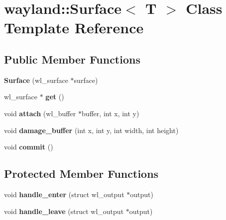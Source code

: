\hypertarget{classwayland_1_1Surface}{}\section{wayland\+::Surface$<$ T $>$ Class Template Reference}
\label{classwayland_1_1Surface}
\subsection*{Public Member Functions}
\begin{DoxyCompactItemize}
\item 
\mbox{\label{classwayland_1_1Surface_ae6c2ccc191d8db31c5ac86178d12c2cf}} 
{\bfseries Surface} (wl\+\_\+surface $\ast$surface)
\item 
\mbox{\label{classwayland_1_1Surface_a75e18c61f3514149ee980f8fbd85f6f7}} 
wl\+\_\+surface $\ast$ {\bfseries get} ()
\item 
\mbox{\label{classwayland_1_1Surface_a345de99f1061edd208220aa990e9aa4f}} 
void {\bfseries attach} (wl\+\_\+buffer $\ast$buffer, int x, int y)
\item 
\mbox{\label{classwayland_1_1Surface_ad5e7d371020467076a0d31e512d731ed}} 
void {\bfseries damage\+\_\+buffer} (int x, int y, int width, int height)
\item 
\mbox{\label{classwayland_1_1Surface_a11cba9dc143bb00d46a7a41099831068}} 
void {\bfseries commit} ()
\end{DoxyCompactItemize}
\subsection*{Protected Member Functions}
\begin{DoxyCompactItemize}
\item 
\mbox{\label{classwayland_1_1Surface_a756fde1c99f0ea0e3c2c34abf24d7ed0}} 
void {\bfseries handle\+\_\+enter} (struct wl\+\_\+output $\ast$output)
\item 
\mbox{\label{classwayland_1_1Surface_ade310e7140e70b284ce2ad1fea9d692d}} 
void {\bfseries handle\+\_\+leave} (struct wl\+\_\+output $\ast$output)
\end{DoxyCompactItemize}

